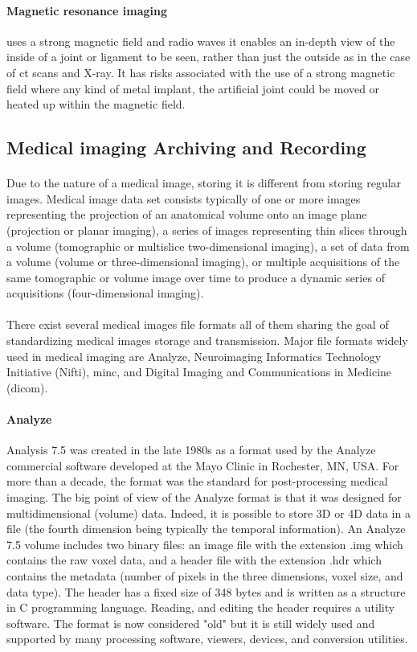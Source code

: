 \paragraph{Magnetic resonance imaging}
uses a strong magnetic field and radio waves it enables an in-depth view of the inside of a joint or ligament to be seen, rather than just the outside as in the case of \acs{ct} scans and X-ray. It has risks associated with the use of a strong magnetic field where any kind of metal implant, the artificial joint could be moved or heated up within the magnetic field.
\subsection{Medical imaging Archiving and Recording} 
\paragraph{}
Due to the nature of a medical image, storing it is different from storing regular images. Medical image data set consists typically of one or more images representing the projection of an anatomical volume onto an image plane (projection or planar imaging), a series of images representing thin slices through a volume (tomographic or multislice two-dimensional imaging), a set of data from a volume (volume or three-dimensional imaging), or multiple acquisitions of the same tomographic or volume image over time to produce a dynamic series of acquisitions (four-dimensional imaging).\cite{ME:1}
\paragraph{}
There exist several medical images file formats all of them sharing the goal of standardizing medical images storage and transmission. Major file formats widely used in medical imaging are Analyze, Neuroimaging Informatics Technology Initiative (Nifti), \acs{minc}, and Digital Imaging and Communications in Medicine (\acs{dicom}).
\paragraph{Analyze}
Analysis 7.5 was created in the late 1980s as a format used by the Analyze commercial software developed at the Mayo Clinic in Rochester, MN, USA. For more than a decade, the format was the standard for post-processing medical imaging. The big point of view of the Analyze format is that it was designed for multidimensional (volume) data. Indeed, it is possible to store 3D or 4D data in a file (the fourth dimension being typically the temporal information). An Analyze 7.5 volume includes two binary files: an image file with the extension .img which contains the raw voxel data, and a header file with the extension .hdr which contains the metadata (number of pixels in the three dimensions, voxel size, and data type). The header has a fixed size of 348 bytes and is written as a structure in C programming language. Reading, and editing the header requires a utility software. The format is now considered "old" but it is still widely used and supported by many processing software, viewers, devices, and conversion utilities.\cite{ME:1}
